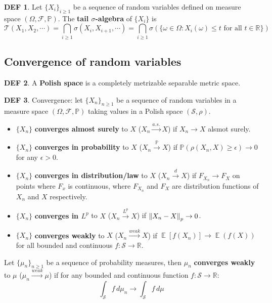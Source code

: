 \documentclass[hidelinks,11pt]{article}
\theoremstyle{definition}
\newtheorem*{defin}{DEF}
\theoremstyle{dotless}
\theoremstyle{remark}
\DeclareMathOperator{\E}{\mathbb{E}}
\DeclareMathOperator{\1}{\mathbf{1}}
\begin{document}
\begin{defin}
Let $\{X_i\}_{i\geq1}$ be a sequence of random variables defined on measure space $(\Omega,\mathcal{F},\mathbb{P})$. The \textbf{tail $\sigma$-algebra} of $\{X_i\}$ is
\[\mathcal{T}(X_1,X_2,\cdots)=\bigcap_{i\geq1}\sigma(X_i,X_{i+1},\cdots)=\bigcap_{i\geq1}\sigma(\{\omega\in\Omega:X_i(\omega)\leq t\textrm{ for all }t\in\mathbb{R}\})\]
\end{defin}

\subsection{Convergence of random variables}

\begin{defin}
A \textbf{Polish space} is a completely metrizable separable metric space.
\end{defin}

\begin{defin}Convergence: let $\{X_n\}_{n\geq1}$ be a sequence of random variables in a measure space $(\Omega,\mathcal{F},\mathbb{P})$ taking values in a Polish space $(\mathcal{S},\rho)$.\begin{itemize}
    \item $\{X_n\}$ \textbf{converges almost surely} to $X$ ($X_n\xrightarrow{a.s.}X$) if $X_n\to X$ alsmot surely.
    \item $\{X_n\}$ \textbf{converges in probability} to $X$ ($X_n\xrightarrow{\mathbb{P}}X$) if $\mathbb{P}(\rho(X_n,X)\geq\epsilon)\to0$ for any $\epsilon>0$.
    \item $\{X_n\}$ \textbf{converges in distribution/law} to $X$ ($X_n\xrightarrow{d}X$) if $F_{X_n}\to F_X$ on points where $F_x$ is continuous, where $F_{X_n}$ and $F_X$ are distribution functions of $X_n$ and $X$ respectively.
    \item $\{X_n\}$ \textbf{converges in $L^p$} to $X$ ($X_n\xrightarrow{L^p}X$) if $\norm{X_n-X}_p\to0$.
    \item $\{X_n\}$ \textbf{converges weakly} to $X$ ($X_n\xrightarrow{weak}X$) if $\E[f(X_n)]\to\E(f(X))$ for all bounded and continuous $f:\mathcal{S}\to\mathbb{R}$.
\end{itemize}
Let $\{\mu_n\}_{n\geq1}$ be a sequence of probability measures, then $\mu_n$ \textbf{converges weakly} to $\mu$ ($\mu_n\xrightarrow{weak}\mu$) if for any bounded and continuous function $f:\mathcal{S}\to\mathbb{R}$:
\[\int_\mathcal{S}f\,d\mu_n\to\int_\mathcal{S}f\,d\mu\]
\end{defin}
\end{document}
